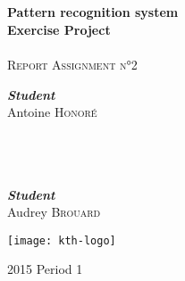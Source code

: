 \begin{titlepage}
  \begin{sffamily}
    \begin{center}

      \textsc{ }\\[1.5cm]

      \HRule \\[0.4cm]
      { \Huge \bfseries Pattern recognition system\\Exercise Project\\[0.4cm] }
      \HRule \\[2.5cm]
      \textsc{\LARGE Report Assignment n°2}~\\[2.5cm]
      \begin{minipage}{0.4\textwidth}
        \begin{flushleft} \large
          \emph{\textbf{Student}}\\
          Antoine \textsc{Honoré}\\
          ~\\~\\~\\
        \end{flushleft}
      \end{minipage}
      \hfill
      \begin{minipage}{0.4\textwidth}
        \begin{flushright} \large
          \emph{\textbf{Student}}\\
          Audrey \textsc{Brouard}\\
        \end{flushright}
      \end{minipage}
      \texttt{[image: kth-logo]}

     

      \vfill

      {\large 2015 Period 1}

    \end{center}
  \end{sffamily}

\end{titlepage}



